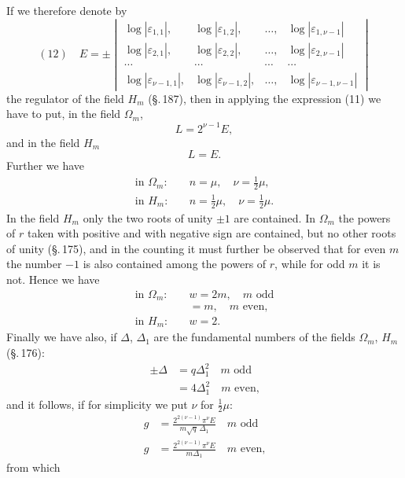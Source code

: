 
If we therefore denote by
\[
(12)\quad E = \pm
\begin{vmatrix}
\log|\varepsilon_{1,1}|, & \log|\varepsilon_{1,2}|, & \ldots, & \log|\varepsilon_{1,\nu-1}| \\
\log|\varepsilon_{2,1}|, & \log|\varepsilon_{2,2}|, & \ldots, & \log|\varepsilon_{2,\nu-1}| \\
\cdots & \cdots & \cdots & \cdots \\
\log|\varepsilon_{\nu-1,1}|, & \log|\varepsilon_{\nu-1,2}|, & \ldots, & \log|\varepsilon_{\nu-1,\nu-1}|
\end{vmatrix}
\]
the regulator of the field $H_m$ (\S.\,187), then in applying the expression (11) we have to put, in the field $\Omega_m$,
\[
L = 2^{\nu-1} E,
\]
and in the field $H_m$
\[
L = E.
\]
Further we have
\[
\begin{aligned}
\text{in } \Omega_m: & \quad n = \mu, \quad \nu = \tfrac{1}{2}\mu, \\
\text{in } H_m: & \quad n = \tfrac{1}{2}\mu, \quad \nu = \tfrac{1}{2}\mu.
\end{aligned}
\]
In the field $H_m$ only the two roots of unity $\pm 1$ are contained. In $\Omega_m$ the powers of $r$ taken with positive and with negative sign are contained, but no other roots of unity (\S.\,175), and in the counting it must further be observed that for even $m$ the number $-1$ is also contained among the powers of $r$, while for odd $m$ it is not. Hence we have
\[
\begin{aligned}
\text{in } \Omega_m: & \quad w = 2m, \quad m \text{ odd} \\
& \quad = m, \quad m \text{ even,} \\
\text{in } H_m: & \quad w = 2.
\end{aligned}
\]
Finally we have also, if $\varDelta$, $\varDelta_1$ are the fundamental numbers of the fields $\Omega_m$, $H_m$ (\S.\,176):
\[
\begin{aligned}
\pm \varDelta & = q\varDelta_1^2 \quad m \text{ odd} \\
& = 4\varDelta_1^2 \quad m \text{ even,}
\end{aligned}
\]
and it follows, if for simplicity we put $\nu$ for $\tfrac{1}{2}\mu$:
\[
\begin{aligned}
g & = \frac{2^{2(\nu-1)}\pi^\nu E}{m\sqrt{q}\,\varDelta_1} \quad m \text{ odd} \\
g & = \frac{2^{2(\nu-1)}\pi^\nu E}{m\varDelta_1} \quad m \text{ even,}
\end{aligned}
\]
from which

